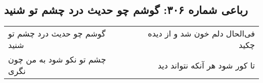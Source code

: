 \begin{center}
\section*{رباعی شماره ۳۰۶: گوشم چو حدیث درد چشم تو شنید}
\label{sec:sh306}
\begin{longtable}{l p{0.5cm} r}
گوشم چو حدیث درد چشم تو شنید
&&
فی‌الحال دلم خون شد و از دیده چکید
\\
چشم تو نکو شود به من چون نگری
&&
تا کور شود هر آنکه نتواند دید
\\
\end{longtable}
\end{center}
